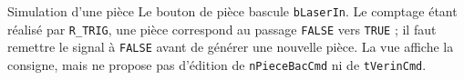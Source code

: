 {  \begin{notebox}[colback=ekwarning,colframe=orange!35]{Simulation d'une pièce}
    Le bouton de pièce bascule \texttt{bLaserIn}. Le comptage étant réalisé par \texttt{R\_TRIG}, une pièce correspond au passage \texttt{FALSE} vers \texttt{TRUE} ; il faut remettre le signal à \texttt{FALSE} avant de générer une nouvelle pièce. La vue affiche la consigne, mais ne propose pas d'édition de \texttt{nPieceBacCmd} ni de \texttt{tVerinCmd}.
  \end{notebox}
}

\newpage

